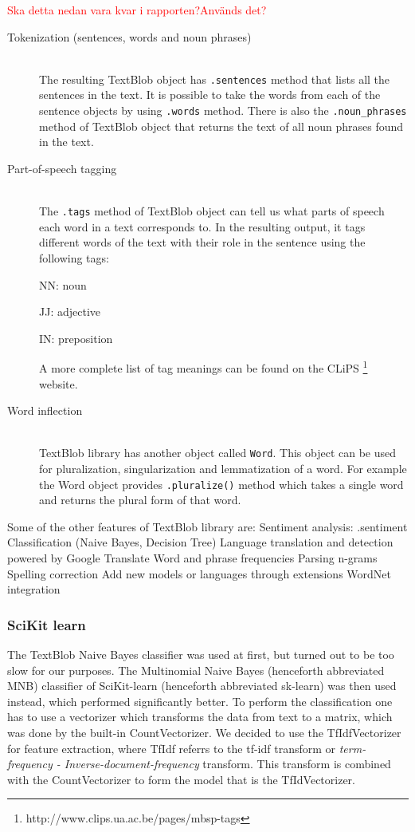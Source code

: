 \documentclass[a4paper]{article}
\begin{document}
\textcolor{red}{Ska detta nedan vara kvar i rapporten?Används det?}
\begin{description}
  \item[Tokenization (sentences, words and noun phrases)] \hfill \\
  The resulting TextBlob object has \texttt{.sentences} method that lists all the sentences in the text. It is possible to take the words from each of the sentence objects by using \texttt{.words} method. There is also the \texttt{.noun\_phrases} method of TextBlob object that returns the text of all noun phrases found in the text.
  
  \item[Part-of-speech tagging] \hfill \\
  The \texttt{.tags} method of TextBlob object can tell us what parts of speech each word in a text corresponds to. In the resulting output, it tags different words of the text with their role in the sentence using the following tags: 

  NN: noun

  JJ: adjective

  IN: preposition

  A more complete list of tag meanings can be found on the CLiPS  \footnote{http://www.clips.ua.ac.be/pages/mbsp-tags} website.
 
  \item[Word inflection] \hfill \\
  TextBlob library has another object called \texttt{Word}. This object can be used for pluralization, singularization and lemmatization of a word. For example the Word object provides \texttt{.pluralize()} method which takes a single word and returns the plural form of that word. 
 
\end{description}
Some of the other features of TextBlob library are:
Sentiment analysis: .sentiment
Classification (Naive Bayes, Decision Tree)
Language translation and detection powered by Google Translate
Word and phrase frequencies
Parsing
n-grams
Spelling correction
Add new models or languages through extensions
WordNet integration


\subsubsection{SciKit learn}

The TextBlob Naive Bayes classifier was used at first, but turned out to be too slow for our purposes. The Multinomial Naive Bayes (henceforth abbreviated MNB) classifier of SciKit-learn (henceforth abbreviated sk-learn) was then used instead, which performed significantly better. To perform the classification one has to use a vectorizer which transforms the data from text to a matrix, which was done by the built-in CountVectorizer. We decided to use the TfIdfVectorizer for feature extraction, where TfIdf referrs to the tf-idf transform or \textit{term-frequency - Inverse-document-frequency} transform\cite{skfeatures}. This transform is combined with the CountVectorizer to form the model that is the TfIdVectorizer.\\
\end{document}
